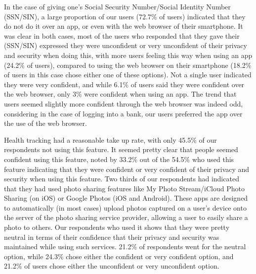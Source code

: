 \documentclass{sigchi}
\begin{document}
In the case of giving one's Social Security Number/Social Identity Number (SSN/SIN), a large proportion of our users (72.7\% of users) indicated that they do not do it over an app, or even with the web browser of their smartphone. It was clear in both cases, most of the users who responded that they gave their (SSN/SIN) expressed they were unconfident or very unconfident of their privacy and security when doing this, with more users feeling this way when using an app (24.2\% of users), compared to using the web browser on their smartphone (18.2\% of users in this case chose either one of these options). Not a single user indicated they were very confident, and while 6.1\% of users said they were confident over the web browser,  only 3\% were confident when using an app. The trend that users seemed slightly more confident through the web browser was indeed odd, considering in the case of logging into a bank, our users preferred the app over the use of the web browser.

Health tracking had a reasonable take up rate, with only 45.5\% of our respondents not using this feature. It seemed pretty clear that people seemed confident using this feature, noted by 33.2\% out of the 54.5\% who used this feature indicating that they were confident or very confident of their privacy and security when using this feature. Two thirds of our respondents had indicated that they had used photo sharing features like My Photo Stream/iCloud Photo Sharing (on iOS) or Google Photos (iOS and Android). These apps are designed to automatically (in most cases) upload photos captured on a user's device onto the server of the photo sharing service provider, allowing a user to easily share a photo to others. Our respondents who used it shows that they were pretty neutral in terms of their confidence that their privacy and security was maintained while using such services. 21.2\% of respondents went for the neutral option, while 24.3\% chose either the confident or very confident option, and 21.2\% of users chose either the unconfident or very unconfident option. 
\end{document}
